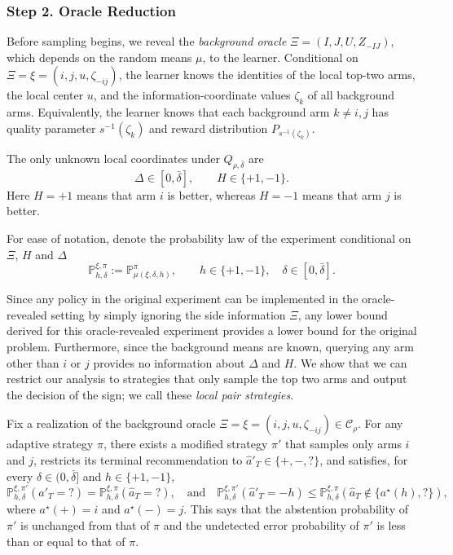 \documentclass[10pt]{article}
\theoremstyle{plain}
\begin{document}
\subsubsection{Step 2. Oracle Reduction}

Before sampling begins, we reveal the \emph{background oracle} $\Xi=(I,J,U,Z_{-IJ})$, which depends on the random means $\mu$, to the learner. Conditional on
$\Xi=\xi=(i,j,u,\zeta_{-ij})$, the learner knows the identities of the
local top-two arms, the local center $u$, and the information-coordinate
values $\zeta_k$ of all background arms. Equivalently, the learner knows
that each background arm $k\neq i,j$ has quality parameter
$s^{-1}(\zeta_k)$ and reward distribution $P_{s^{-1}(\zeta_k)}$.

The only unknown local coordinates under $Q_{\rho,\bar\delta}$ are
\[
    \Delta\in[0,\bar\delta],
    \qquad
    H\in\{+1,-1\}.
\]
Here $H=+1$ means that arm $i$ is better, whereas $H=-1$ means that arm
$j$ is better.

For ease of notation, denote the probability law of the experiment conditional on $\Xi$, $H$ and $\Delta$
\[
    \mathbb P_{h,\delta}^{\xi,\pi}
    :=
    \mathbb P_{\mu(\xi,\delta,h)}^\pi,
    \qquad
    h\in\{+1,-1\},
    \quad
    \delta\in[0,\bar\delta].
\]

Since any policy in the original experiment can be implemented in the oracle-revealed setting by simply ignoring the side information $\Xi$, any lower bound derived for this oracle-revealed experiment provides a lower bound for the original problem. Furthermore, since the background means are known, querying any arm other than $i$ or $j$ provides no information about $\Delta$ and $H$. We show that we can restrict our analysis to strategies that only sample the top two arms and output the decision of the sign; we call these {\em local pair strategies}.


\begin{lemma}
\label{lem:oracle-reduction-transfer-lower}
Fix a realization of the background oracle $\Xi=\xi=(i,j,u,\zeta_{-ij}) \in \mathcal C_\rho$. For any adaptive strategy $\pi$, there exists a modified strategy $\pi'$ that samples only arms $i$ and $j$, restricts its terminal recommendation to $\hat{a}'_T \in \{+,-,?\}$, and satisfies, for every $\delta\in(0,\bar\delta]$ and $h\in\{+1,-1\}$,
\begin{equation}
    \mathbb{P}_{h,\delta}^{\xi,\pi'}(\hat{a}'_T = ?) = \mathbb{P}_{h,\delta}^{\xi,\pi}(\hat{a}_T = ?) , \quad\mbox{and}\quad
\mathbb{P}_{h,\delta}^{\xi,\pi'}(\hat{a}'_T = -h) \le \mathbb{P}_{h,\delta}^{\xi,\pi}(\hat{a}_T \notin \{a^\star(h), ?\}), \label{eqn:simulate2}
\end{equation}
where $a^\star(+) = i$ and $a^\star(-) = j$. This says that the abstention probability of $\pi'$ is unchanged from that of $\pi$ and the undetected error probability of $\pi'$ is less than or equal to that of $\pi$.
\end{lemma}
\end{document}
